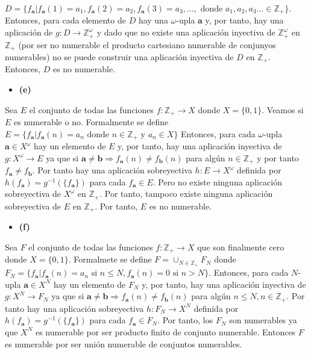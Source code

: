\documentclass{article}
\newcommand{\vect}[1]{\boldsymbol{#1}}
\begin{document}
$D=\{f_{\vect{a}}| f_{\vect{a}}(1)=a_1,f_{\vect{a}}(2)=a_2,f_{\vect{a}}(3)=a_3,...,\text{ donde } a_1,a_2,a_3...\in \mathbb{Z}_{+}\}$.
\newline
Entonces,  para cada elemento de $D$ hay una $\omega$-upla $\vect{a}$ y, por tanto, hay una aplicación de $g:D\rightarrow \mathbb{Z}^{\omega}_{+}$ y dado que no existe una aplicación inyectiva de $\mathbb{Z}^{\omega}_{+}$ en $ \mathbb{Z}_{+}$ (por ser no numerable el producto cartesiano numerable de conjunyos numerables) no se puede construir una aplicación inyectiva de $D$ en $\mathbb{Z}_{+}$. Entonces, $D$ es no numerable.
\begin{itemize}
\item \bf (e) \rm
\end{itemize}
Sea $E$ el conjunto de todas las funciones $f:\mathbb{Z}_{+}\rightarrow X$ donde $X=\{0,1\}$. Veamos si $E$ es numerable o no. Formalmente se define $E=\{f_{\vect{a}}| f_{\vect{a}}(n)=a_n \text{ donde }n\in \mathbb{Z}_{+} \text{ y } a_n\in X\}$ Entonces, para cada $\omega$-upla $\vect{a}\in X^{\omega}$ hay un elemento de $E$ y, por tanto, hay una aplicación inyectiva de $g:X^{\omega}\rightarrow E$ ya que si $\vect{a}\neq\vect{b}\Rightarrow f_{\vect{a}}(n)\neq f_{\vect{b}}(n)$ para algún $n\in \mathbb{Z}_{+}$ y por tanto $f_{\vect{a}}\neq f_{\vect{b}}$. Por tanto hay una aplicación sobreyectiva $h:E\rightarrow X^{\omega}$ definida por $h(f_{\vect{a}})=g^{-1}(\{f_{\vect{a}}\})$ para cada $f_{\vect{a}}\in E$. Pero no existe ninguna aplicación sobreyectiva de $X^{\omega}$ en $\mathbb{Z}_{+}$. Por tanto, tampoco existe ninguna aplicación sobreyectiva de $E$ en $\mathbb{Z}_{+}$. Por tanto, $E$ es no numerable.
\begin{itemize}
\item \bf (f) \rm
\end{itemize}
Sea $F$ el conjunto de todas las funciones $f:\mathbb{Z}_{+}\rightarrow X$ que son finalmente cero donde $X=\{0,1\}$. Formalmete se define $F=\cup_{N\in\mathbb{Z}_{+}}F_N$ donde $F_N=\{f_{\vect{a}}|f_{\vect{a}}(n)=a_n\text{ si }n\leq N, f_{\vect{a}}(n)=0\text{ si } n>N\}$. Entonces, para cada $N$-upla $\vect{a}\in X^{N}$ hay un elemento de $F_N$ y, por tanto, hay una aplicación inyectiva de $g:X^{N}\rightarrow F_N$ ya que si $\vect{a}\neq\vect{b}\Rightarrow f_{\vect{a}}(n)\neq f_{\vect{b}}(n)$ para algún $n\leq N, n\in \mathbb{Z}_{+}$. Por tanto hay una aplicación sobreyectiva $h:F_N\rightarrow X^{N}$ definida por $h(f_{\vect{a}})=g^{-1}(\{f_{\vect{a}}\})$ para cada $f_{\vect{a}}\in F_N$. Por tanto, los $F_N$ son numerables ya que $X^N$ es numerable por ser producto finito de conjunto numerable. Entonces $F$ es numerable por ser unión numerable de conjuntos  numerables.
\end{document}

